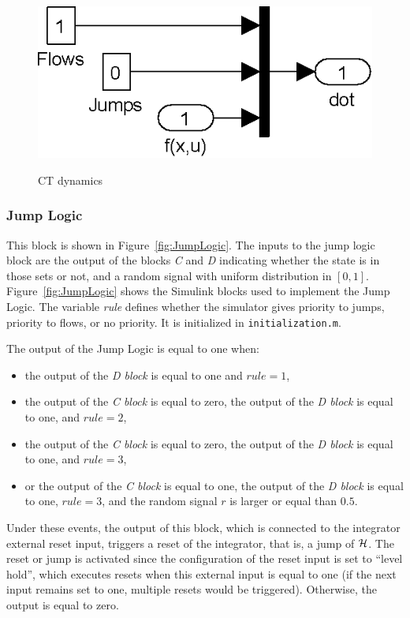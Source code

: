 \documentclass{article}
\begin{document}
\begin{figure}[ht]
  \begin{center}
    {\includegraphics[width=.4\textwidth]{figures/Simulink/CTdynamics.eps}}
   \caption{CT dynamics}
\label{fig:CTdynamics}
 \end{center}
\end{figure}


\subsubsection{Jump Logic}

This block is shown in Figure~\ref{fig:JumpLogic}. The inputs to the jump logic block are the output of the blocks {\em C} and {\em D} indicating whether the state is in those sets or not, and a random signal with uniform distribution in $[0,1]$. Figure~\ref{fig:JumpLogic} shows the Simulink blocks used to implement the Jump Logic. The variable {\em rule} defines whether the simulator gives priority to jumps, priority to flows, or no priority. It is initialized in {\tt initialization.m}.

The output of the Jump Logic is equal to one when:
\begin{itemize}
\item the output of the {\em D block} is equal to one and $rule=1$,
\item the output of the {\em C block} is equal to zero, the output of the {\em D block} is equal to one, and $rule=2$,
\item the output of the {\em C block} is equal to zero, the output of the {\em D block} is equal to one, and $rule=3$,
\item or the output of the {\em C block} is equal to one, the output of the {\em D block} is equal to one, $rule = 3$, and the random signal $r$ is larger or equal than $0.5$.
\end{itemize}
Under these events, the output of this block, which is connected to the integrator external reset input, triggers a reset of the integrator, that is, a jump of $\mathcal{H}$. The reset or jump is activated since the configuration of the reset input is set to ``level hold'', which executes resets when this external input is equal to one (if the next input remains set to one, multiple resets would be triggered). Otherwise, the output is equal to zero.
\end{document}
